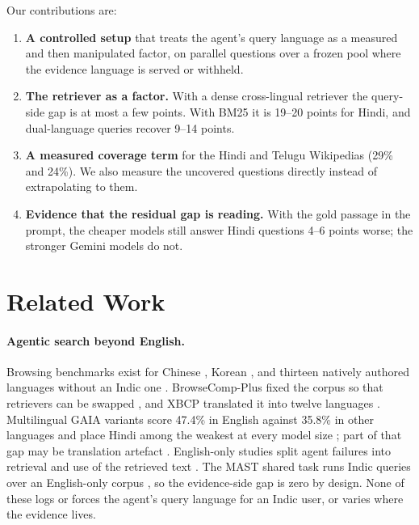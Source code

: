 Our contributions are:
\begin{enumerate}\setlength\itemsep{0pt}
\item \textbf{A controlled setup} that treats the agent's query language as a measured and then manipulated factor, on parallel questions over a frozen pool where the evidence language is served or withheld.
\item \textbf{The retriever as a factor.} With a dense cross-lingual retriever the query-side gap is at most a few points. With BM25 it is 19--20 points for Hindi, and dual-language queries recover 9--14 points.
\item \textbf{A measured coverage term} for the Hindi and Telugu Wikipedias (29\% and 24\%). We also measure the uncovered questions directly instead of extrapolating to them.
\item \textbf{Evidence that the residual gap is reading.} With the gold passage in the prompt, the cheaper models still answer Hindi questions 4--6 points worse; the stronger Gemini models do not.
\end{enumerate}

\section{Related Work}
\label{sec:related}

\paragraph{Agentic search beyond English.} Browsing benchmarks exist for Chinese \citep{a2504_19314}, Korean \citep{a2606_02404,a2606_27595}, and thirteen natively authored languages without an Indic one \citep{a2610_03574}. BrowseComp-Plus fixed the corpus so that retrievers can be swapped \citep{a2508_06600}, and XBCP translated it into twelve languages \citep{a2606_15345}. Multilingual GAIA variants score 47.4\% in English against 35.8\% in other languages and place Hindi among the weakest at every model size \citep{a2505_15935,a2608_08775}; part of that gap may be translation artefact \citep{a2604_24929}. English-only studies split agent failures into retrieval and use of the retrieved text \citep{a2608_01913,a2608_05212,a2609_08094}. The MAST shared task runs Indic queries over an English-only corpus \citep{mast2026}, so the evidence-side gap is zero by design. None of these logs or forces the agent's query language for an Indic user, or varies where the evidence lives.

